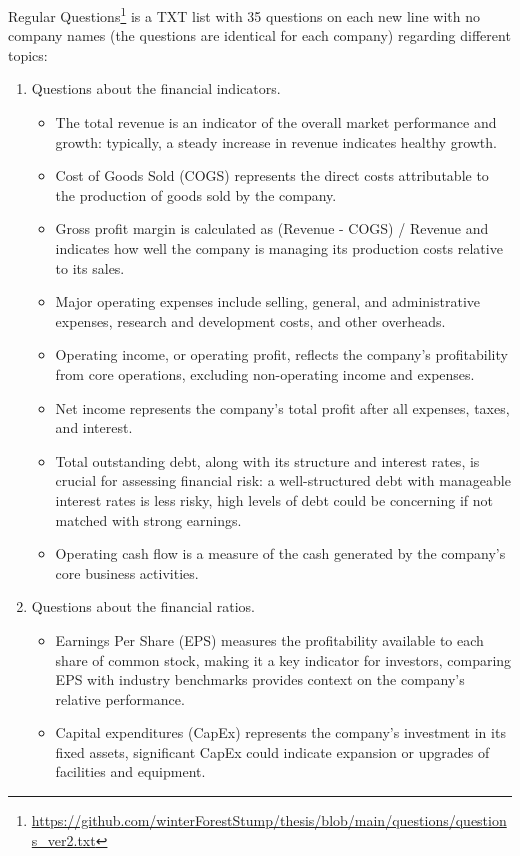 Regular Questions\footnote{\url{https://github.com/winterForestStump/thesis/blob/main/questions/questions_ver2.txt}} is a TXT list with 35 questions on each new line with no company names (the questions are identical for each company) regarding different topics:
\begin{enumerate}
\item Questions about the financial indicators.
\begin{itemize}
    \item The total revenue is an indicator of the overall market performance and growth: typically, a steady increase in revenue indicates healthy growth.
    \item Cost of Goods Sold (COGS) represents the direct costs attributable to the production of goods sold by the company.
    \item Gross profit margin is calculated as (Revenue - COGS) / Revenue and indicates how well the company is managing its production costs relative to its sales.
    \item Major operating expenses include selling, general, and administrative expenses, research and development costs, and other overheads.
    \item Operating income, or operating profit, reflects the company’s profitability from core operations, excluding non-operating income and expenses.
    \item Net income represents the company’s total profit after all expenses, taxes, and interest.
    \item Total outstanding debt, along with its structure and interest rates, is crucial for assessing financial risk: a well-structured debt with manageable interest rates is less risky, high levels of debt could be concerning if not matched with strong earnings.
    \item Operating cash flow is a measure of the cash generated by the company's core business activities.
\end{itemize}
\item Questions about the financial ratios. 
\begin{itemize}
    \item Earnings Per Share (EPS) measures the profitability available to each share of common stock, making it a key indicator for investors, comparing EPS with industry benchmarks provides context on the company's relative performance.
    \item Capital expenditures (CapEx) represents the company’s investment in its fixed assets, significant CapEx could indicate expansion or upgrades of facilities and equipment.

\end{itemize}
\end{enumerate}
